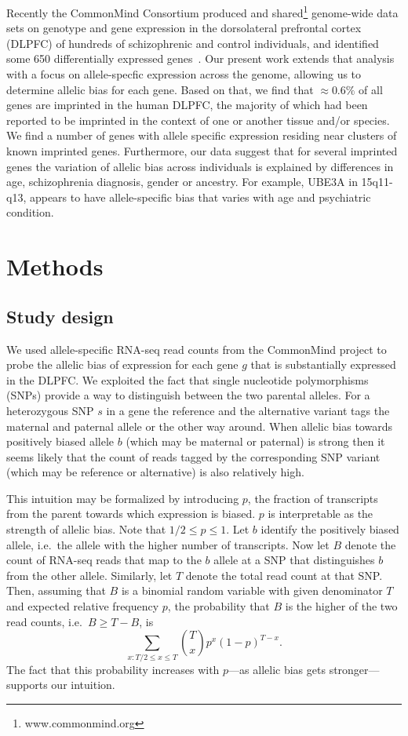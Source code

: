 \documentclass[12pt,letterpaper]{article}
\begin{document}
Recently the CommonMind Consortium produced and
shared\footnote{www.commonmind.org} genome-wide data sets on genotype and gene
expression in the dorsolateral prefrontal cortex (DLPFC) of hundreds of
schizophrenic and control individuals, and identified some 650 differentially
expressed genes~\cite{Fromer2016a}. Our present work extends that analysis
with a focus on allele-specfic expression across the genome, allowing us to
determine allelic bias for each gene.  Based on that, we find that \(\approx
0.6\%\) of all genes are imprinted in the human DLPFC, the majority of which
had been reported to be imprinted in the context of one or another tissue
and/or species. We find a number of genes with allele specific expression
residing near clusters of known imprinted genes. Furthermore, our data suggest
that for several imprinted genes the variation of allelic bias across
individuals is explained by differences in age, schizophrenia diagnosis,
gender or ancestry.  For example, UBE3A in 15q11-q13, appears to have
allele-specific bias that varies with age and psychiatric condition.

\section{Methods}

\subsection{Study design}

We used allele-specific RNA-seq read counts from the CommonMind project to
probe the allelic bias of expression for each gene \(g\) that is
substantially expressed in the DLPFC.  We exploited the fact that single
nucleotide polymorphisms (SNPs) provide a way to distinguish between the two
parental alleles.  For a heterozygous SNP \(s\) in a gene the reference and the
alternative variant tags the maternal and paternal allele or the other way
around.  When allelic bias towards positively biased allele \(b\) (which may
be maternal or paternal) is strong then it seems likely that the count of
reads tagged by the corresponding SNP variant (which may be reference or
alternative) is also relatively high.

This intuition may be formalized by introducing \(p\), the fraction of
transcripts from the parent towards which expression is biased.  \(p\) is
interpretable as the strength of allelic bias.  Note that \(1/2\le p\le 1\).
Let \(b\) identify the positively biased allele, i.e.~the allele with the
higher number of transcripts.  Now let \(B\) denote the count of RNA-seq reads
that map to the \(b\) allele at a SNP that distinguishes \(b\) from the other
allele.  Similarly, let \(T\) denote the total read count at that SNP.  Then,
assuming that \(B\) is a binomial random variable with given denominator \(T\)
and expected relative frequency \(p\), the probability that \(B\) is the
higher of the two read counts, i.e.~\(B \ge T - B\), is \[\sum_{x:T/2\le x\le
T} {T \choose x} p^x (1 - p)^{T-x}.\] The fact that this probability increases
with \(p\)---as allelic bias gets stronger---supports our intuition.
\end{document}
